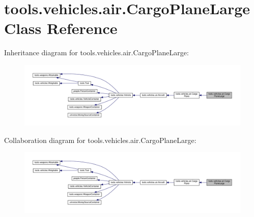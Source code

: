 \hypertarget{classtools_1_1vehicles_1_1air_1_1_cargo_plane_large}{}\section{tools.\+vehicles.\+air.\+Cargo\+Plane\+Large Class Reference}
\label{classtools_1_1vehicles_1_1air_1_1_cargo_plane_large}


Inheritance diagram for tools.\+vehicles.\+air.\+Cargo\+Plane\+Large\+:
\nopagebreak
\begin{figure}[H]
\begin{center}
\leavevmode
\includegraphics[width=350pt]{classtools_1_1vehicles_1_1air_1_1_cargo_plane_large__inherit__graph}
\end{center}
\end{figure}


Collaboration diagram for tools.\+vehicles.\+air.\+Cargo\+Plane\+Large\+:
\nopagebreak
\begin{figure}[H]
\begin{center}
\leavevmode
\includegraphics[width=350pt]{classtools_1_1vehicles_1_1air_1_1_cargo_plane_large__coll__graph}
\end{center}
\end{figure}
